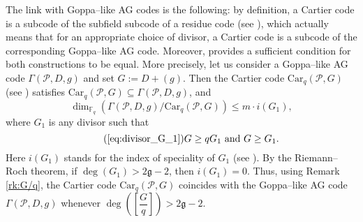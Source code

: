 \documentclass[journal]{IEEEtran}
\theoremstyle{plain}
\theoremstyle{definition}
\theoremstyle{remark}
\newcommand{\calP}{\mathcal{P}}
\newcommand{\fq}{\mathbb{F}_{q}}
\begin{document}
	The link with Goppa--like AG codes is the following: by definition, a Cartier code is a subcode of the subfield subcode of a residue code (see \cite[Proposition 4.3]{Cou14}), which actually means that for an appropriate choice of divisor, a Cartier code is a subcode of the corresponding Goppa--like AG code. Moreover, \cite[Theorem 5.1]{Cou14} provides a sufficient condition for both constructions to be equal. More precisely, let us consider a Goppa--like AG code $\Gamma(\calP,D,g)$  and set $G := D+(g)$. Then the Cartier code $\mathrm{Car}_q(\calP,G)$ (see \cite[Definition 4.2]{Cou14}) satisfies $\mathrm{Car}_q(\calP,G) \subseteq \Gamma(\calP,D,g)$, and 
	$$ \dim_{\fq} \left( \Gamma(\calP,D,g)/ \mathrm{Car}_q(\calP,G)\right) \leq m \cdot i(G_1),$$
	where $G_1$ is any divisor such that 
	\begin{equation} \tag{\ref{eq:divisor_G_1}}
		G \geq qG_1 \ \mathrm{and} \ G \geq G_1.
	\end{equation}
	Here $i(G_1)$ stands for the index of speciality of $G_1$ (see \cite[Definition~1.6.10]{Sti09}). By the Riemann--Roch theorem, if $\deg(G_1) > 2\mathfrak{g}-2$, then $i(G_1) =0.$ 
	Thus, using Remark \ref{rk:G/q}, the Cartier code $\mathrm{Car}_q(\calP,G)$ coincides with the Goppa--like AG code $\Gamma(\calP,D,g)$ whenever $\deg\left(\left[\dfrac{G}{q} \right]\right) > 2\mathfrak{g}-2$. 
	
\end{document}
